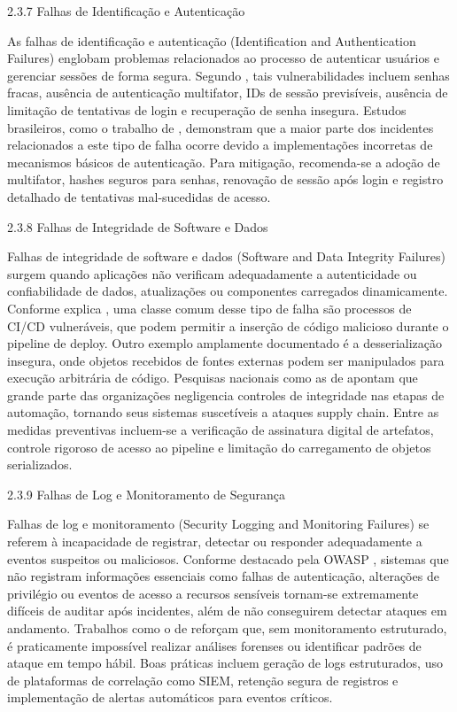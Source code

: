 \documentclass[12pt]{article}
\begin{document}
2.3.7 Falhas de Identificação e Autenticação

As falhas de identificação e autenticação (Identification and Authentication Failures) englobam problemas relacionados ao processo de autenticar usuários e gerenciar
 sessões de forma segura. Segundo \textcite{owasp10}, tais vulnerabilidades incluem senhas fracas, ausência de autenticação multifator, IDs de sessão previsíveis,
  ausência de limitação de tentativas de login e recuperação de senha insegura. Estudos brasileiros, como o trabalho de \textcite{ifgoiano2022}, demonstram que a maior
   parte dos incidentes relacionados a este tipo de falha ocorre devido a implementações incorretas de mecanismos básicos de autenticação. Para mitigação, recomenda-se
    a adoção de multifator, hashes seguros para senhas, renovação de sessão após login e registro detalhado de tentativas mal-sucedidas de acesso.

2.3.8 Falhas de Integridade de Software e Dados

Falhas de integridade de software e dados (Software and Data Integrity Failures) surgem quando aplicações não verificam adequadamente a autenticidade ou confiabilidade
 de dados, atualizações ou componentes carregados dinamicamente. Conforme explica \textcite{owasp10}, uma classe comum desse tipo de falha são processos de CI/CD vulneráveis,
  que podem permitir a inserção de código malicioso durante o pipeline de deploy. Outro exemplo amplamente documentado é a desserialização insegura, onde objetos recebidos de
   fontes externas podem ser manipulados para execução arbitrária de código. Pesquisas nacionais como as de \textcite{unb2024} apontam que grande parte das organizações
    negligencia controles de integridade nas etapas de automação, tornando seus sistemas suscetíveis a ataques supply chain. Entre as medidas preventivas incluem-se
     a verificação de assinatura digital de artefatos, controle rigoroso de acesso ao pipeline e limitação do carregamento de objetos serializados.

2.3.9 Falhas de Log e Monitoramento de Segurança

Falhas de log e monitoramento (Security Logging and Monitoring Failures) se referem à incapacidade de registrar, detectar ou responder adequadamente a eventos suspeitos 
ou maliciosos. Conforme destacado pela OWASP \textcite{owasp10}, sistemas que não registram informações essenciais como falhas de autenticação, alterações de privilégio 
ou eventos de acesso a recursos sensíveis tornam-se extremamente difíceis de auditar após incidentes, além de não conseguirem detectar ataques em andamento. 
Trabalhos como o de \textcite{unb2024} reforçam que, sem monitoramento estruturado, é praticamente impossível realizar análises forenses ou identificar padrões de ataque 
em tempo hábil. Boas práticas incluem geração de logs estruturados, uso de plataformas de correlação como SIEM, retenção segura de registros e implementação de alertas 
automáticos para eventos críticos.
\end{document}
